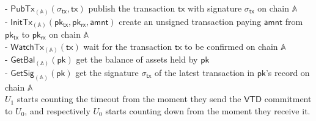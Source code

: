 \documentclass{article}      	%
\begin{document}
- $\mathsf{PubTx}_{(\mathbb{A})}(\sigma_{\mathsf{tx}}, \mathsf{tx})$ publish the transaction $\mathsf{tx}$ with signature $\sigma_{\mathsf{tx}}$ on chain $\mathbb{A}$ \\
- $\mathsf{InitTx}_{(\mathbb{A})}(\mathsf{pk_{tx}}, \mathsf{pk_{rx}}, \mathsf{amnt})$ create an unsigned transaction paying $\mathsf{amnt}$ from $\mathsf{pk_{tx}}$ to $\mathsf{pk_{rx}}$ on chain $\mathbb{A}$ \\
- $\mathsf{WatchTx}_{(\mathbb{A})}(\mathsf{tx})$ wait for the transaction $\mathsf{tx}$ to be confirmed on chain $\mathbb{A}$ \\
- $\mathsf{GetBal}_{(\mathbb{A})}(\mathsf{pk})$ get the balance of assets held by $\mathsf{pk}$ \\
- $\mathsf{GetSig}_{(\mathbb{A})}(\mathsf{pk})$ get the signature $\sigma_{\mathsf{tx}}$ of the latest transaction in $\mathsf{pk}$'s record on chain $\mathbb{A}$ \\

$U_1$ starts counting the timeout from the moment they send the $\mathsf{VTD}$ commitment to $U_0$, and respectively $U_0$ starts counting down from the moment they receive it. \\
\\
\end{document}
